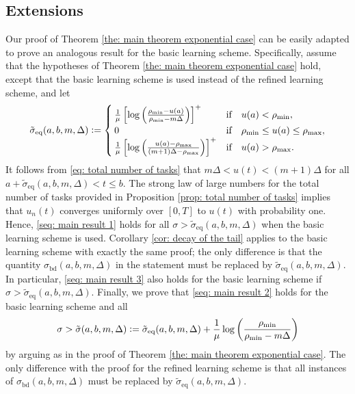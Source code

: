 \documentclass[a4paper, 12pt]{article}
\theoremstyle{definition}
\newcommand{\defeq}{\vcentcolon=}
\newcommand{\rhomin}{\rho_{\min}}
\newcommand{\rhomax}{\rho_{\max}}
\newcommand{\bd}{\mathrm{bd}}
\newcommand{\eq}{\mathrm{eq}}
\begin{document}
\subsection{Extensions}
\label{sub: extensions}

Our proof of Theorem \ref{the: main theorem exponential case} can be easily adapted to prove an analogous result for the basic learning scheme. Specifically, assume that the hypotheses of Theorem \ref{the: main theorem exponential case} hold, except that the basic learning scheme is used instead of the refined learning scheme, and let
\begin{equation*}
	\tilde{\sigma}_\eq(a, b, m, \Delta) \defeq
	\begin{cases}
		\frac{1}{\mu}\left[\log \left(\frac{\rhomin - u(a)}{\rhomin - m \Delta}\right)\right]^+ & \text{if} \quad u(a) < \rhomin, \\
		0 & \text{if} \quad \rhomin \leq u(a) \leq \rhomax, \\
		\frac{1}{\mu}\left[\log \left(\frac{u(a) - \rhomax}{(m + 1) \Delta - \rhomax}\right)\right]^+ & \text{if} \quad u(a) > \rhomax.
	\end{cases}
\end{equation*}
It follows from \eqref{eq: total number of tasks} that $m\Delta < u(t) < (m + 1)\Delta$ for all $a + \tilde{\sigma}_\eq(a, b, m, \Delta) < t \leq b$. The strong law of large numbers for the total number of tasks provided in Proposition \ref{prop: total number of tasks} implies that $u_n(t)$ converges uniformly over $[0, T]$ to $u(t)$ with probability one. Hence, \eqref{seq: main result 1} holds for all $\sigma > \tilde{\sigma}_\eq(a, b, m, \Delta)$ when the basic learning scheme is used. Corollary \ref{cor: decay of the tail} applies to the basic learning scheme with exactly the same proof; the only difference is that the quantity $\sigma_{\bd}(a, b, m, \Delta)$ in the statement must be replaced by $\tilde{\sigma}_{\eq}(a, b, m, \Delta)$. In particular, \eqref{seq: main result 3} also holds for the basic learning scheme if $\sigma > \tilde{\sigma}_\eq(a, b, m, \Delta)$. Finally, we prove that \eqref{seq: main result 2} holds for the basic learning scheme and all
\begin{equation*}
	\sigma > \tilde{\sigma}(a, b, m, \Delta) \defeq \tilde{\sigma}_\eq(a, b, m, \Delta) + \frac{1}{\mu}\log\left(\frac{\rhomin}{\rhomin - m \Delta}\right)
\end{equation*}
by arguing as in the proof of Theorem \ref{the: main theorem exponential case}. The only difference with the proof for the refined learning scheme is that all instances of $\sigma_{\bd}(a, b, m, \Delta)$ must be replaced by $\tilde{\sigma}_{\eq}(a, b, m, \Delta)$.
\end{document}
